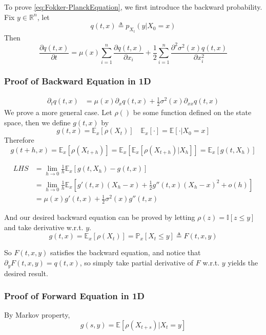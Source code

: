         To prove \ref{eq:Fokker-PlanckEquation}, we first introduce the backward probability. Fix $y \in \mathbb{R}^n$, let
        \[ q(t,x) \triangleq p_{X_t}(y|X_0=x) \]
        Then
        \begin{equation}\label{eq:Fokker-PlanckBackwardEq}
            \frac{\partial q(t,x)}{\partial t} = \mu(x)\sum_{i=1}^n \frac{\partial q(t,x)}{\partial x_i} + \frac{1}{2}\sum_{i=1}^n\frac{\partial^2 \sigma^2(x)q(t,x)}{\partial x_i^2}
        \end{equation}

        \subsubsection{Proof of Backward Equation in 1D}
            \begin{align*}
                \partial_t q(t,x) &= \mu(x)\partial_xq(t,x) + \frac{1}{2}\sigma^2(x)\partial_{xx}q(t,x)
            \end{align*}
            We prove a more general case. Let $\rho()$ be some function defined on the state space, then we define $g(t,x)$ by
            \[ g(t,x) = \mathbb{E}_x[\rho(X_t)] \quad \mathbb{E}_x[\cdot]=\mathbb{E}[\cdot|X_0=x] \]
            Therefore
            \[ g(t+h,x) = \mathbb{E}_x[\rho(X_{t+h})] = \mathbb{E}_x[\mathbb{E}_x[\rho(X_{t+h})|X_h]] = \mathbb{E}_x[g(t, X_h)] \]

            \begin{align*}
                LHS &= \lim_{h \to 0}\frac{1}{h}\mathbb{E}_x[g(t,X_h) - g(t,x)]\\
                &= \lim_{h \to 0}\frac{1}{h}\mathbb{E}_x[g'(t,x)(X_h - x) + \frac{1}{2}g''(t,x)(X_h-x)^2 + o(h)]\\
                &= \mu(x)g'(t,x) + \frac{1}{2}\sigma^2(x)g''(t,x)
            \end{align*}

            And our desired backward equation can be proved by letting $\rho(z) = \mathbb{I}[z \le y]$ and take derivative w.r.t. $y$.
            \[ g(t,x) = \mathbb{E}_x[\rho(X_t)] = \mathbb{P}_x[X_t \le y] \triangleq F(t,x,y) \]

            So $F(t,x,y)$ satisfies the backward equation, and notice that $\partial_y F(t,x,y) = q(t,x)$, so simply take partial derivative of $F$ w.r.t. $y$ yields the desired result.

        \subsubsection{Proof of Forward Equation in 1D}
            By Markov property,
            \[ g(s,y) = \mathbb{E}[\rho(X_{t+s})|X_t=y] \]

